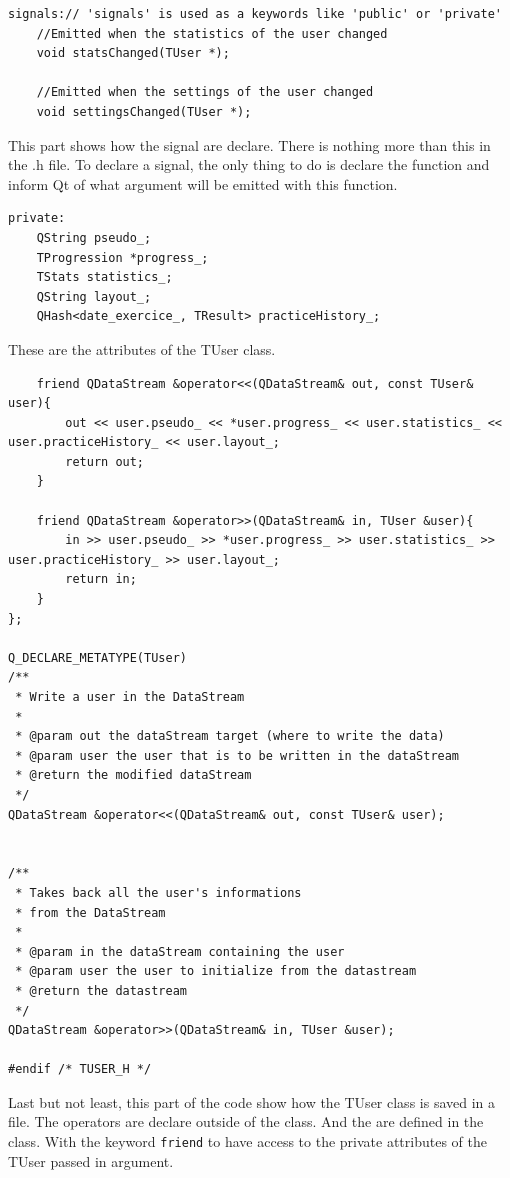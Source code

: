 \begin{lstlisting}
signals:// 'signals' is used as a keywords like 'public' or 'private'
	//Emitted when the statistics of the user changed
    void statsChanged(TUser *);

	//Emitted when the settings of the user changed
    void settingsChanged(TUser *);
\end{lstlisting}
This part shows how the signal are declare. There is nothing more than this in the .h file. To declare a signal, the only thing to do is declare the function and inform Qt of what argument will be emitted with this function.

\begin{lstlisting}
private:
    QString pseudo_;
    TProgression *progress_;
    TStats statistics_;
    QString layout_;
	QHash<date_exercice_, TResult> practiceHistory_;
\end{lstlisting}
These are the attributes of the TUser class.

\begin{lstlisting}
    friend QDataStream &operator<<(QDataStream& out, const TUser& user){
        out << user.pseudo_ << *user.progress_ << user.statistics_ << user.practiceHistory_ << user.layout_;
        return out;
    }

    friend QDataStream &operator>>(QDataStream& in, TUser &user){
        in >> user.pseudo_ >> *user.progress_ >> user.statistics_ >> user.practiceHistory_ >> user.layout_;
        return in;
    }
};

Q_DECLARE_METATYPE(TUser)
/**
 * Write a user in the DataStream
 * 
 * @param out the dataStream target (where to write the data)
 * @param user the user that is to be written in the dataStream
 * @return the modified dataStream
 */
QDataStream &operator<<(QDataStream& out, const TUser& user);


/**
 * Takes back all the user's informations
 * from the DataStream
 * 
 * @param in the dataStream containing the user
 * @param user the user to initialize from the datastream
 * @return the datastream
 */
QDataStream &operator>>(QDataStream& in, TUser &user);

#endif /* TUSER_H */

\end{lstlisting}
Last but not least, this part of the code show how the TUser class is saved in a file. The operators are declare outside of the class. And the are defined in the class. With the keyword \texttt{friend} to have access to the private attributes of the TUser passed in argument.

